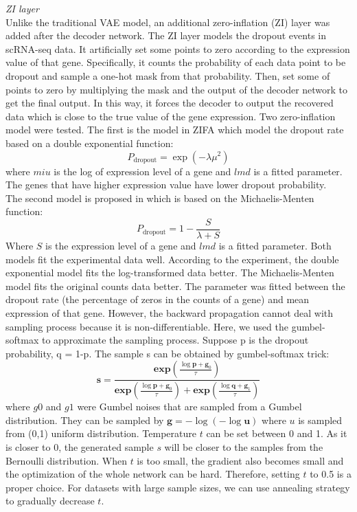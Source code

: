 \vspace{0.5cm}
\noindent\emph{ZI layer} \\
Unlike the traditional VAE model, an additional zero-inflation (ZI) layer was added after the decoder network. The ZI layer models the dropout events in scRNA-seq data. It artificially set some points to zero according to the expression value of that gene. Specifically, it counts the probability of each data point to be dropout and sample a one-hot mask from that probability. Then, set some of points to zero by multiplying the mask and the output of the decoder network to get the final output. In this way, it forces the decoder to output the recovered data which is close to the true value of the gene expression. Two zero-inflation model were tested. The first is the model in ZIFA \cite{Pierson2015} which model the dropout rate based on a double exponential function: 
\begin{equation}
    P_{\text {dropout}}=\exp \left(-\lambda \mu^{2}\right)
\end{equation}
where $miu$ is the log of expression level of a gene and $lmd$ is a fitted parameter. The genes that have higher expression value have lower dropout probability. \\
The second model is proposed in \cite{andrews2017modelling} which is based on the Michaelis-Menten function:
\begin{equation}
    P_{\text {dropout}}=1-\frac{S}{\lambda+S}
\end{equation}
Where $S$ is the expression level of a gene and $lmd$ is a fitted parameter. 
Both models fit the experimental data well. According to the experiment, the double exponential model fits the log-transformed data better. The Michaelis-Menten model fits the original counts data better. 
The parameter was fitted between the dropout rate (the percentage of zeros in the counts of a gene) and mean expression of that gene.
However, the backward propagation cannot deal with sampling process because it is non-differentiable. Here, we used the gumbel-softmax \cite{jang2016categorical} to approximate the sampling process. Suppose p is the dropout probability, q = 1-p. The sample s can be obtained by gumbel-softmax trick:
\begin{equation}
    \boldsymbol{s}=\frac{\boldsymbol{e} \boldsymbol{x} \boldsymbol{p}\left(\frac{\log \boldsymbol{p}+\boldsymbol{g}_{0}}{\tau}\right)}{\boldsymbol{e x p}\left(\frac{\log \boldsymbol{p}+\boldsymbol{g}_{0}}{\tau}\right)+\boldsymbol{e} \boldsymbol{x} \boldsymbol{p}\left(\frac{\log \boldsymbol{q}+\boldsymbol{g}_{1}}{\tau}\right)}
\end{equation}
where $g0$ and $g1$ were Gumbel noises that are sampled from a Gumbel distribution. They can be sampled by $\boldsymbol{g}=-\log (-\log \boldsymbol{u})$ where $u$ is sampled from (0,1) uniform distribution. Temperature $t$ can be set between 0 and 1. As it is closer to 0, the generated sample $s$ will be closer to the samples from the Bernoulli distribution. When $t$ is too small, the gradient also becomes small and the optimization of the whole network can be hard. Therefore, setting $t$ to 0.5 is a proper choice. For datasets with large sample sizes, we can use annealing strategy to gradually decrease $t$.

